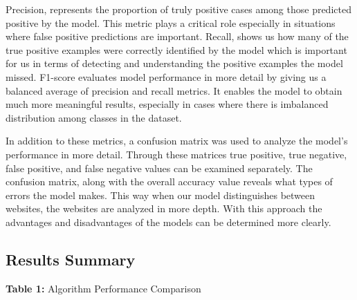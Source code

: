 \documentclass[conference]{IEEEtran}
\begin{document}
Precision, represents the proportion of truly positive cases among those predicted positive by the model.  This metric plays a critical role especially in situations where false positive predictions are important. Recall, shows us how many of the true positive examples were correctly identified by the model which is important for us in terms of detecting and understanding the positive examples the model missed. F1-score evaluates model performance in more detail by giving us a balanced average of precision and recall metrics. It enables the model to obtain much more meaningful results, especially in cases where there is imbalanced distribution among classes in the dataset.

In addition to these metrics, a confusion matrix was used to analyze the model's performance in more detail. Through these matrices true positive, true negative, false positive, and false negative values can be examined separately. The confusion matrix, along with the overall accuracy value reveals what types of errors the model makes. This way when our model distinguishes between websites, the websites are analyzed in more depth. With this approach the advantages and disadvantages of the models can be determined more clearly.
	
	\subsection{Results Summary}
\begin{center}
\small
\renewcommand{\arraystretch}{2.0}

\textbf{Table 1:} Algorithm Performance Comparison
\end{center}
\end{document}
